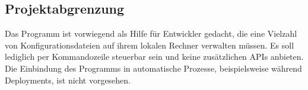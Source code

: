 \subsection{Projektabgrenzung}
Das Programm ist vorwiegend als Hilfe für Entwickler gedacht, die eine Vielzahl von
Konfigurationsdateien auf ihrem lokalen Rechner verwalten müssen. Es soll lediglich
per Kommandozeile steuerbar sein und keine zusätzlichen APIs anbieten. Die Einbindung
des Programms in automatische Prozesse, beispielsweise während Deployments, ist
nicht vorgesehen.
